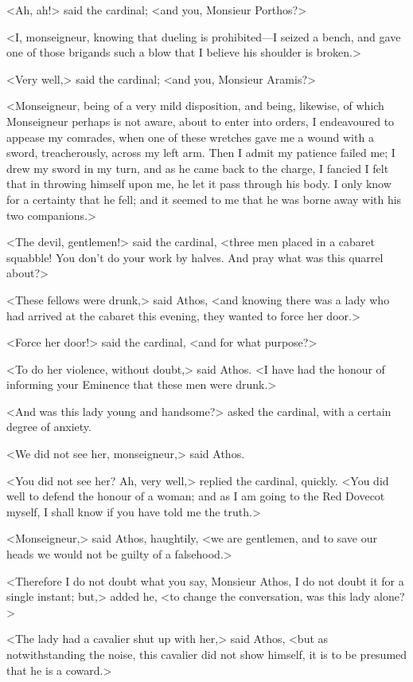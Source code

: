 <Ah, ah!> said the cardinal; <and you, Monsieur Porthos?> 

<I, monseigneur, knowing that dueling is prohibited—I seized a bench, and gave one of those brigands such a blow that I believe his shoulder is broken.> 

<Very well,> said the cardinal; <and you, Monsieur Aramis?> 

<Monseigneur, being of a very mild disposition, and being, likewise, of which Monseigneur perhaps is not aware, about to enter into orders, I endeavoured to appease my comrades, when one of these wretches gave me a wound with a sword, treacherously, across my left arm. Then I admit my patience failed me; I drew my sword in my turn, and as he came back to the charge, I fancied I felt that in throwing himself upon me, he let it pass through his body. I only know for a certainty that he fell; and it seemed to me that he was borne away with his two companions.> 

<The devil, gentlemen!> said the cardinal, <three men placed  in a cabaret squabble! You don't do your work by halves. And pray what was this quarrel about?> 

<These fellows were drunk,> said Athos, <and knowing there was a lady who had arrived at the cabaret this evening, they wanted to force her door.> 

<Force her door!> said the cardinal, <and for what purpose?> 

<To do her violence, without doubt,> said Athos. <I have had the honour of informing your Eminence that these men were drunk.> 

<And was this lady young and handsome?> asked the cardinal, with a certain degree of anxiety. 

<We did not see her, monseigneur,> said Athos. 

<You did not see her? Ah, very well,> replied the cardinal, quickly. <You did well to defend the honour of a woman; and as I am going to the Red Dovecot myself, I shall know if you have told me the truth.> 

<Monseigneur,> said Athos, haughtily, <we are gentlemen, and to save our heads we would not be guilty of a falsehood.> 

<Therefore I do not doubt what you say, Monsieur Athos, I do not doubt it for a single instant; but,> added he, <to change the conversation, was this lady alone?> 

<The lady had a cavalier shut up with her,> said Athos, <but as notwithstanding the noise, this cavalier did not show himself, it is to be presumed that he is a coward.> 

